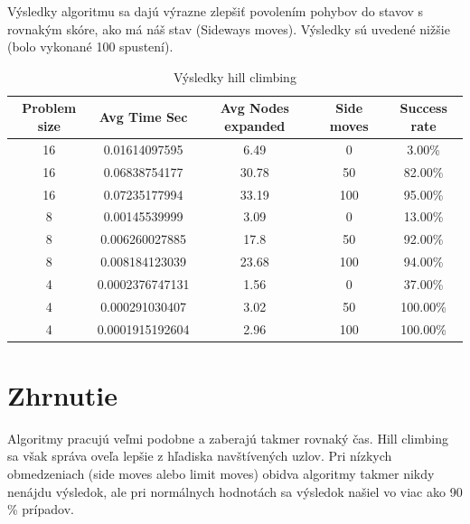 Výsledky algoritmu sa dajú výrazne zlepšiť povolením pohybov do stavov s rovnakým skóre, ako má náš stav (Sideways moves).
Výsledky sú uvedené nižšie (bolo vykonané 100 spustení).
\begin{table}[ht]
  \centering
  \begin{tabular}{|c|c|c|c|c|}
    \hline
    \textbf{Problem size} & \textbf{Avg Time Sec} & \textbf{Avg Nodes expanded} & \textbf{Side moves} & \textbf{Success rate} \\
    \hline
    16                    & 0.01614097595         & 6.49                        & 0                   & 3.00\%                \\
    16                    & 0.06838754177         & 30.78                       & 50                  & 82.00\%               \\
    16                    & 0.07235177994         & 33.19                       & 100                 & 95.00\%               \\
    \hline
    8                     & 0.00145539999         & 3.09                        & 0                   & 13.00\%               \\
    8                     & 0.006260027885        & 17.8                        & 50                  & 92.00\%               \\
    8                     & 0.008184123039        & 23.68                       & 100                 & 94.00\%               \\
    \hline
    4                     & 0.0002376747131       & 1.56                        & 0                   & 37.00\%               \\
    4                     & 0.000291030407        & 3.02                        & 50                  & 100.00\%              \\
    4                     & 0.0001915192604       & 2.96                        & 100                 & 100.00\%              \\
    \hline
  \end{tabular}
  \caption{Výsledky hill climbing}\label{tab:table2}
\end{table}


\section{Zhrnutie}

Algoritmy pracujú veľmi podobne a zaberajú takmer rovnaký čas. Hill climbing sa však správa oveľa lepšie z hľadiska navštívených uzlov. Pri nízkych obmedzeniach (side moves alebo limit moves) obidva algoritmy takmer nikdy nenájdu výsledok, ale pri normálnych hodnotách sa výsledok našiel vo viac ako 90 \% prípadov.
